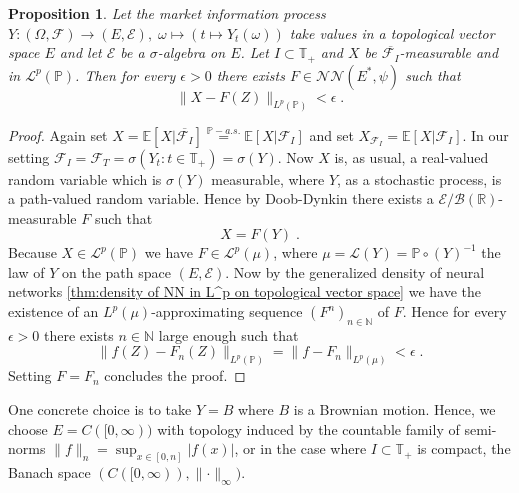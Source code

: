 \documentclass[11pt]{report}
\theoremstyle{plain} %
\newtheorem{proposition}[proposition]{Proposition}
\theoremstyle{definition} %
\theoremstyle{remark} %
\begin{document}
\begin{proposition}\label{prop:reduction to countably generated sigma algebra is not fundamental}
    Let the market information process \(Y:(\Omega,\mathcal{F})\to(E,\mathcal{E}),\; \omega\mapsto \left(t\mapsto Y_t(\omega)\right)\) take values in a topological vector space \(E\) and let \(\mathcal{E}\) be a \(\sigma\)-algebra on \(E\). Let \(I\subset\mathbb{T}_+\) and \(X\) be \(\overline{\mathcal{F}_I}\)-measurable and in \(\mathcal{L}^p(\mathbb{P})\). Then for every \(\epsilon>0\) there exists \(F\in\mathcal{NN}(E^*,\psi)\) such that 
    \begin{equation}
        \lVert X-F(Z)\rVert_{L^p(\mathbb{P})}<\epsilon\;.
    \end{equation}
\end{proposition}
\begin{proof}
    Again set \(X=\mathbb{E}[X|\overline{\mathcal{F}_I}]\overset{\mathbb{P}-a.s.}{=}\mathbb{E}[X|\mathcal{F}_I]\) and set \(X_{\mathcal{F}_I}=\mathbb{E}[X|\mathcal{F}_I]\). In our setting \(\mathcal{F}_I=\mathcal{F}_{T}=\sigma(Y_t:t\in\mathbb{T}_+)=\sigma(Y)\). Now \(X\) is, as usual, a real-valued random variable which is \(\sigma(Y)\) measurable, where \(Y\), as a stochastic process, is a path-valued random variable. Hence by Doob-Dynkin there exists a \(\mathcal{E}/\mathcal{B}(\mathbb{R})\)-measurable \(F\) such that 
    \begin{equation}
        X = F(Y)\;.
    \end{equation}
    Because \(X\in\mathcal{L}^p(\mathbb{P})\) we have \(F\in\mathcal{L}^p(\mu)\), where \(\mu=\mathcal{L}(Y)=\mathbb{P}\circ(Y)^{-1}\) the law of \(Y\) on the path space \((E,\mathcal{E})\). Now by the generalized density of neural networks \cref{thm:density of NN in L^p on topological vector space} we have the existence of an \(L^p(\mu)\)-approximating sequence \((F^n)_{n\in\mathbb{N}}\) of \(F\). Hence for every \(\epsilon>0\) there exists \(n\in\mathbb{N}\) large enough such that 
    \begin{equation}
        \lVert f(Z)-F_n(Z)\rVert_{L^p(\mathbb{P})}=\lVert f-F_n\rVert_{L^p(\mu)}<\epsilon\;.
    \end{equation}
    Setting \(F=F_n\) concludes the proof.
\end{proof}
One concrete choice is to take \(Y=B\) where \(B\) is a Brownian motion. Hence, we choose \(E=C([0,\infty))\) with topology induced by the countable family of semi-norms \(\rVert f\lVert_{n}=\sup_{x\in[0,n]}|f(x)|\), or in the case where \(I\subset\mathbb{T}_+\) is compact, the Banach space \((C([0,\infty)),\lVert\cdot\rVert_{\infty})\). \\\\
\end{document}
